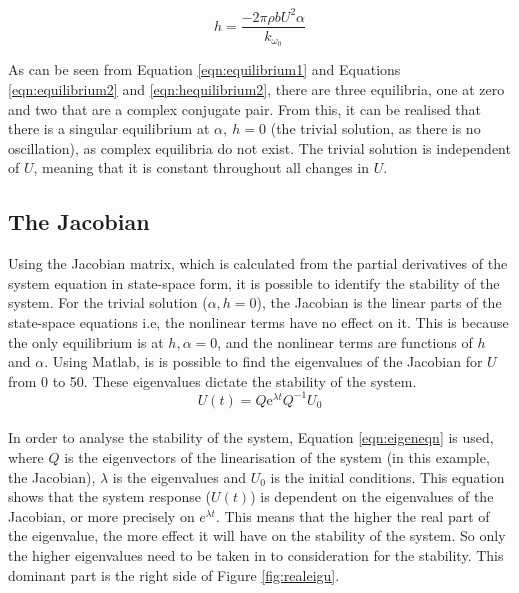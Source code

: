 \begin{equation}
\label{eqn:hequilibrium2}
h = \frac{-2\pi \rho b U^{2} \alpha}{k_{\omega_{0}}}
\end{equation}

\noindent As can be seen from Equation \ref{eqn:equilibrium1} and Equations \ref{eqn:equilibrium2} and \ref{eqn:hequilibrium2}, there are three equilibria, one at zero and two that are a complex conjugate pair. From this, it can be realised that there is a singular equilibrium at $\alpha, \:h = 0$ (the trivial solution, as there is no oscillation), as complex equilibria do not exist. The trivial solution is independent of $U$, meaning that it is constant throughout all changes in $U$.

\subsection{The Jacobian}
\label{sec:jacobian}
Using the Jacobian matrix, which is calculated from the partial derivatives of the system equation in state-space form, it is possible to identify the stability of the system. For the trivial solution ($\alpha , h = 0$), the Jacobian is the linear parts of the state-space equations i.e, the nonlinear terms have no effect on it. This is because the only equilibrium is at $h, \alpha = 0$, and the nonlinear terms are functions of $h$ and $\alpha$.
Using Matlab, is is possible to find the eigenvalues of the Jacobian for $U$ from 0 to 50. These eigenvalues dictate the stability of the system. \\

\begin{equation}
\label{eqn:eigeneqn}
U(t) = Q\mathrm{e}^{\lambda t}Q^{-1}U_{0}
\end{equation}\\

\noindent In order to analyse the stability of the system, Equation \ref{eqn:eigeneqn} is used, where $Q$ is the eigenvectors of the linearisation of the system (in this example, the Jacobian), $\lambda$ is the eigenvalues and $U_{0}$ is the initial conditions. This equation shows that the system response ($U(t)$) is dependent on the eigenvalues of the Jacobian, or more precisely on $e^{\lambda t}$. This means that the higher the real part of the eigenvalue, the more effect it will have on the stability of the system. So only the higher eigenvalues need to be taken in to consideration for the stability. This dominant part is the right side of Figure \ref{fig:realeigu}.

